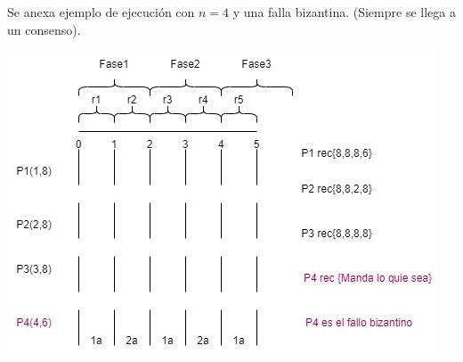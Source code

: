 Se anexa ejemplo de ejecución con $n=4$ y una falla bizantina. (Siempre se llega a un consenso).
\begin{center}
    \includegraphics[scale=0.6]{Grapho.jpeg}
    \end{center}
